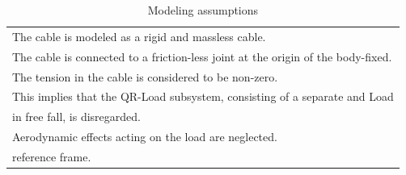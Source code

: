 \begin{table}[h!]
\begin{tabular}{|p{\textwidth}|}
		\tabitem The cable is modeled as a rigid and massless cable. \\
		\tabitem The cable is connected to a friction-less joint at the origin of the body-fixed. \\
		\tabitem The tension in the cable is considered to be non-zero.\\
		\hspace{4mm} This implies that the QR-Load subsystem, consisting of a separate \a{qr} and Load\\
		\hspace{4mm} in free fall, is disregarded.\\		 
		\tabitem Aerodynamic effects acting on the load are neglected.\\
		\hspace{4mm} reference frame.\\
		\hline
	\end{tabular}
	\caption{Modeling assumptions}
	\label{tab:mod.assumptions}
\end{table}



